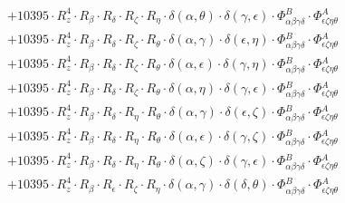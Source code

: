 \documentclass{article}
\begin{document}
\begin{equation}
\begin{array}{c}
 \\[0.2em] 		 + 10395 \cdot R_{z}^{4} \cdot R_{\beta{}} \cdot R_{\delta{}} \cdot R_{\zeta{}} \cdot R_{\eta{}} \cdot \delta{}\left(\alpha{}, \theta{}\right) \cdot \delta{}\left(\gamma{}, \epsilon{}\right) \cdot \Phi{}^{B}_{\alpha{}\beta{}\gamma{}\delta{}} \cdot \Phi{}^{A}_{\epsilon{}\zeta{}\eta{}\theta{}} 
 \\[0.2em] 		 + 10395 \cdot R_{z}^{4} \cdot R_{\beta{}} \cdot R_{\delta{}} \cdot R_{\zeta{}} \cdot R_{\theta{}} \cdot \delta{}\left(\alpha{}, \gamma{}\right) \cdot \delta{}\left(\epsilon{}, \eta{}\right) \cdot \Phi{}^{B}_{\alpha{}\beta{}\gamma{}\delta{}} \cdot \Phi{}^{A}_{\epsilon{}\zeta{}\eta{}\theta{}} 
 \\[0.2em] 		 + 10395 \cdot R_{z}^{4} \cdot R_{\beta{}} \cdot R_{\delta{}} \cdot R_{\zeta{}} \cdot R_{\theta{}} \cdot \delta{}\left(\alpha{}, \epsilon{}\right) \cdot \delta{}\left(\gamma{}, \eta{}\right) \cdot \Phi{}^{B}_{\alpha{}\beta{}\gamma{}\delta{}} \cdot \Phi{}^{A}_{\epsilon{}\zeta{}\eta{}\theta{}} 
 \\[0.2em] 		 + 10395 \cdot R_{z}^{4} \cdot R_{\beta{}} \cdot R_{\delta{}} \cdot R_{\zeta{}} \cdot R_{\theta{}} \cdot \delta{}\left(\alpha{}, \eta{}\right) \cdot \delta{}\left(\gamma{}, \epsilon{}\right) \cdot \Phi{}^{B}_{\alpha{}\beta{}\gamma{}\delta{}} \cdot \Phi{}^{A}_{\epsilon{}\zeta{}\eta{}\theta{}} 
 \\[0.2em] 		 + 10395 \cdot R_{z}^{4} \cdot R_{\beta{}} \cdot R_{\delta{}} \cdot R_{\eta{}} \cdot R_{\theta{}} \cdot \delta{}\left(\alpha{}, \gamma{}\right) \cdot \delta{}\left(\epsilon{}, \zeta{}\right) \cdot \Phi{}^{B}_{\alpha{}\beta{}\gamma{}\delta{}} \cdot \Phi{}^{A}_{\epsilon{}\zeta{}\eta{}\theta{}} 
 \\[0.2em] 		 + 10395 \cdot R_{z}^{4} \cdot R_{\beta{}} \cdot R_{\delta{}} \cdot R_{\eta{}} \cdot R_{\theta{}} \cdot \delta{}\left(\alpha{}, \epsilon{}\right) \cdot \delta{}\left(\gamma{}, \zeta{}\right) \cdot \Phi{}^{B}_{\alpha{}\beta{}\gamma{}\delta{}} \cdot \Phi{}^{A}_{\epsilon{}\zeta{}\eta{}\theta{}} 
 \\[0.2em] 		 + 10395 \cdot R_{z}^{4} \cdot R_{\beta{}} \cdot R_{\delta{}} \cdot R_{\eta{}} \cdot R_{\theta{}} \cdot \delta{}\left(\alpha{}, \zeta{}\right) \cdot \delta{}\left(\gamma{}, \epsilon{}\right) \cdot \Phi{}^{B}_{\alpha{}\beta{}\gamma{}\delta{}} \cdot \Phi{}^{A}_{\epsilon{}\zeta{}\eta{}\theta{}} 
 \\[0.2em] 		 + 10395 \cdot R_{z}^{4} \cdot R_{\beta{}} \cdot R_{\epsilon{}} \cdot R_{\zeta{}} \cdot R_{\eta{}} \cdot \delta{}\left(\alpha{}, \gamma{}\right) \cdot \delta{}\left(\delta{}, \theta{}\right) \cdot \Phi{}^{B}_{\alpha{}\beta{}\gamma{}\delta{}} \cdot \Phi{}^{A}_{\epsilon{}\zeta{}\eta{}\theta{}} 

\end{array}
\end{equation}
\end{document}

